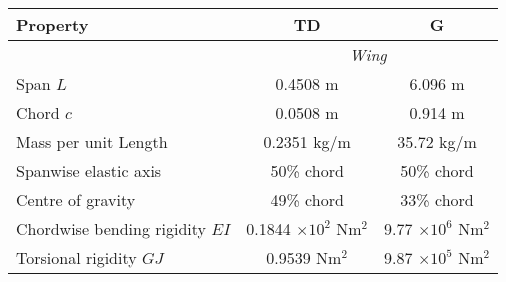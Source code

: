 \documentclass{standalone}
\begin{document}
    \centering
    \begin{tabular}{l c c}
    \toprule
    \toprule
    Property&TD&G\\
    \midrule
    &\multicolumn{2}{c}{\textit{Wing}}\\
    Span $L$     & 0.4508 m & 6.096 m \\
    Chord $c$   & 0.0508 m & 0.914 m \\
    Mass per unit Length     & 0.2351 kg/m & 35.72 kg/m\\
    Spanwise elastic axis   & 50\% chord & 50\% chord\\
    Centre of gravity   & 49\% chord & 33\% chord\\
    Chordwise bending rigidity $EI$  & 0.1844 $\times 10^2$ Nm$^2$ & 9.77 $\times 10^6$ Nm$^2$\\
    Torsional rigidity $GJ$ & 0.9539 Nm$^2$& 9.87 $\times 10^5$ Nm$^2$ \\
    \bottomrule
    \bottomrule
    \end{tabular}
    
\end{document}

